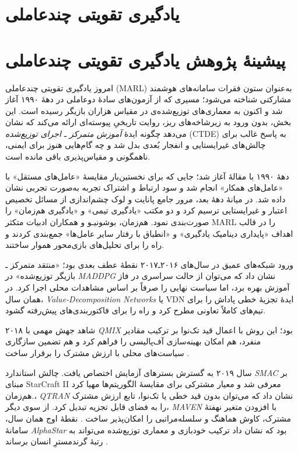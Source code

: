 \section{یادگیری تقویتی چندعاملی}
\section{پیشینهٔ پژوهش یادگیری تقویتی چندعاملی}\label{sec:marl_lit}

امروز یادگیری تقویتی چندعاملی (MARL) به‌عنوان ستون فقرات سامانه‌های هوشمند مشارکتی شناخته می‌شود؛ مسیری که از آزمون‌های سادهٔ دو‌عاملی در دههٔ ۱۹۹۰ آغاز شد و اکنون به معماری‌های توزیع‌شده‌ی در مقیاس هزاران بازیگر رسیده است. این بخش، بدون ورود به زیرشاخه‌های ریز، روایت تاریخیِ پیوسته‌ای ارائه می‌کند که نشان می‌دهد چگونه ایدهٔ \emph{آموزش متمرکز ـ اجرای توزیع‌شده} (CTDE) به پاسخ غالب برای چالش‌های غیرایستایی و انفجار بُعدی بدل شد و چه گام‌هایی هنوز برای ایمنی، ناهمگونی و مقیاس‌پذیری باقی مانده است.

دههٔ ۱۹۹۰ با مقالهٔ \cite{Tan1993} آغاز شد؛ جایی که برای نخستین‌بار مقایسهٔ «عامل‌های مستقل» با «عامل‌های همکار» انجام شد و سود ارتباط و اشتراک تجربه به‌صورت تجربی نشان داده شد. در میانهٔ دههٔ بعد، مرور جامع پانایت و لوک \cite{Panait2005} چشم‌اندازی از مسائل تخصیص اعتبار و غیرایستایی ترسیم کرد و دو مکتب «یادگیری تیمی» و «یادگیری هم‌زمان» را صورت‌بندی نمود.  هم‌زمان، بوشونیـو و همکاران \cite{Busoniu2008} ادبیات متکثر MARL را در قالب اهداف «پایداری دینامیک یادگیری» و «انطباق با رفتار سایر عامل‌ها» جمع‌بندی کردند و راه را برای تحلیل‌های بازی‌محور هموار ساختند. 

ورود شبکه‌های عمیق در سال‌های ۲۰۱۶ـ۲۰۱۷ نقطهٔ عطف بعدی بود؛ «منتقد متمرکز ـ بازیگر توزیع‌شده» در \emph{MADDPG} \cite{Lowe2017} نشان داد که می‌توان از حالت سراسری در فاز آموزش بهره برد، اما سیاست نهایی را صرفاً بر اساس مشاهدات محلی اجرا کرد.  در همان سال، \emph{Value‐Decomposition Networks} یا VDN \cite{Sunehag2017} ایدهٔ تجزیهٔ خطی پاداش را برای تیم‌های کاملاً تعاونی مطرح کرد و راه را برای فاکتوربندی‌های پیش‌رفته گشود. 

۲۰۱۸ شاهد جهش مهمی با \emph{QMIX} بود؛ این روش با اعمال قید تک‌نوا بر ترکیب مقادیر منفرد، هم امکان بهینه‌سازی آف‌پالیسی را فراهم کرد و هم تضمین سازگاری سیاست‌های محلی با ارزش مشترک را برقرار ساخت \cite{Rashid2018}. 

سال ۲۰۱۹ به گسترش بسترهای آزمایش اختصاص یافت. چالش استاندارد \emph{SMAC} بر مبنای StarCraft II معرفی شد و معیار مشترکی برای مقایسهٔ الگوریتم‌ها مهیا کرد \cite{Samvelyan2019SMAC}.هم‌زمان، \emph{QTRAN} \cite{Son2019QTRAN} نشان داد که می‌توان بدون قید خطی یا تک‌نوا، تابع ارزش مشترک را به فضای قابل تجزیه تبدیل کرد. از سوی دیگر، \emph{MAVEN} با افزودن متغیر نهفتهٔ مشترک، کاوش هماهنگ و سلسله‌مراتبی را امکان‌پذیر ساخت \cite{Mahajan2019MAVEN}.  نقطهٔ اوج همان سال، سامانهٔ \emph{AlphaStar} بود که نشان داد ترکیب خودبازی و معماری توزیع‌شده می‌تواند به رتبهٔ گرندمسترِ انسان برساند \cite{Vinyals2019AlphaStar}. 

